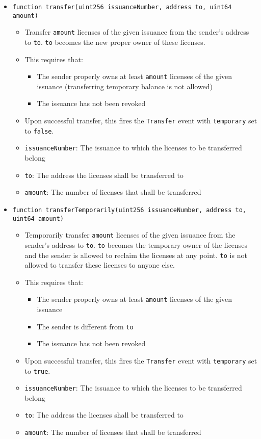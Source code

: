 \documentclass[a4paper]{article}
\begin{document}
\begin{itemize}
  \item \texttt{function transfer(uint256 issuanceNumber, address to, uint64 amount)}
  \begin{itemize}
    \item Transfer \texttt{amount} licenses of the given issuance from the sender's address to \texttt{to}. \texttt{to} becomes the new proper owner of these licenses.
    \item This requires that:
    \begin{itemize}
      \item The sender properly owns at least \texttt{amount} licenses of the given issuance (transferring temporary balance is not allowed)
      \item The issuance has not been revoked
    \end{itemize}
    \item Upon successful transfer, this fires the \texttt{Transfer} event with \texttt{temporary} set to \texttt{false}.
    \item \texttt{issuanceNumber}: The issuance to which the licenses to be transferred belong
    \item \texttt{to}: The address the licenses shall be transferred to
    \item \texttt{amount}: The number of licenses that shall be transferred
  \end{itemize}
  
  \item \texttt{function transferTemporarily(uint256 issuanceNumber, address to, uint64 amount)}
  \begin{itemize}
    \item Temporarily transfer \texttt{amount} licenses of the given issuance from the sender's address to \texttt{to}. \texttt{to} becomes the temporary owner of the licenses and the sender is allowed to reclaim the licenses at any point. \texttt{to} is not allowed to transfer these licenses to anyone else.
    \item This requires that:
    \begin{itemize}
      \item The sender properly owns at least \texttt{amount} licenses of the given issuance
      \item The sender is different from \texttt{to}
      \item The issuance has not been revoked
    \end{itemize}
    \item Upon successful transfer, this fires the \texttt{Transfer} event with \texttt{temporary} set to \texttt{true}.
    \item \texttt{issuanceNumber}: The issuance to which the licenses to be transferred belong
    \item \texttt{to}: The address the licenses shall be transferred to
    \item \texttt{amount}: The number of licenses that shall be transferred
  \end{itemize}
  

\end{itemize}
\end{document}

